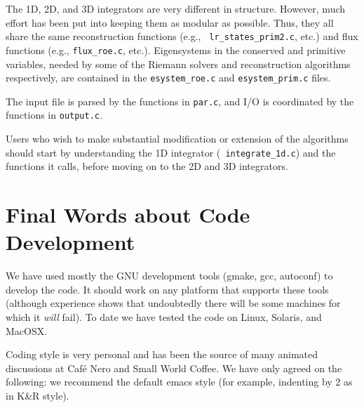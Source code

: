 The 1D, 2D, and 3D integrators are very different in structure.
However, much effort has been put into keeping them as modular as
possible.  Thus, they all share the same reconstruction functions (e.g., {\tt
lr\_states\_prim2.c}, etc.) and flux functions (e.g., {\tt flux\_roe.c},
etc.).  Eigensystems in the conserved and primitive variables, needed by
some of the Riemann solvers and reconstruction algorithms respectively,
are contained in the {\tt esystem\_roe.c} and {\tt esystem\_prim.c} files.

The input file is parsed by the functions in {\tt par.c}, and I/O
is coordinated by the functions in {\tt output.c}.

Users who wish to make substantial modification or extension of
the algorithms should start by understanding the 1D integrator ({\tt
integrate\_1d.c}) and the functions it calls, before moving on to the 2D
and 3D integrators.

\section{Final Words about Code Development}

We have used mostly the GNU development tools (gmake, gcc, autoconf)
to develop the code.  It should work on any platform that supports
these tools (although experience shows that undoubtedly there will be some
machines for which it {\em will} fail).   To date we have tested the
code on Linux, Solaris, and MacOSX.

Coding style is very personal and has been the source of many animated
discussions at Caf\'{e} Nero and Small World Coffee.  We have only agreed
on the following: we recommend the default emacs style (for example,
indenting by 2 as in K\&R style).



